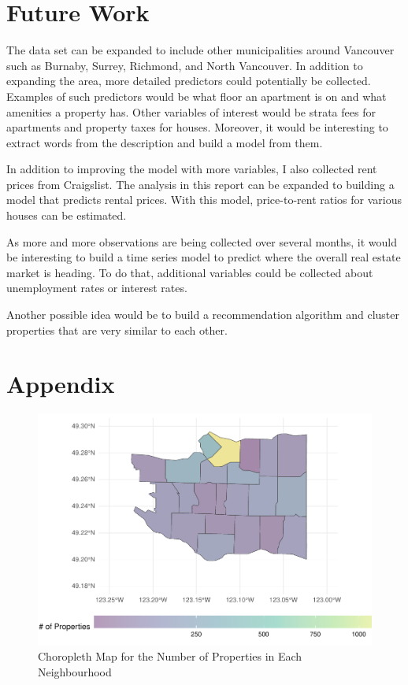 \documentclass[
]{article}
\begin{document}
\hypertarget{future-work}{%
\section{Future Work}\label{future-work}}

The data set can be expanded to include other municipalities around
Vancouver such as Burnaby, Surrey, Richmond, and North Vancouver. In
addition to expanding the area, more detailed predictors could
potentially be collected. Examples of such predictors would be what
floor an apartment is on and what amenities a property has. Other
variables of interest would be strata fees for apartments and property
taxes for houses. Moreover, it would be interesting to extract words
from the description and build a model from them.

In addition to improving the model with more variables, I also collected
rent prices from Craigslist. The analysis in this report can be expanded
to building a model that predicts rental prices. With this model,
price-to-rent ratios for various houses can be estimated.

As more and more observations are being collected over several months,
it would be interesting to build a time series model to predict where
the overall real estate market is heading. To do that, additional
variables could be collected about unemployment rates or interest rates.

Another possible idea would be to build a recommendation algorithm and
cluster properties that are very similar to each other.

\newpage

\hypertarget{appendix}{%
\section{Appendix}\label{appendix}}

\begin{figure}
\centering
\includegraphics{final_report_files/figure-latex/unnamed-chunk-42-1.pdf}
\caption{Choropleth Map for the Number of Properties in Each
Neighbourhood}
\end{figure}
\end{document}
